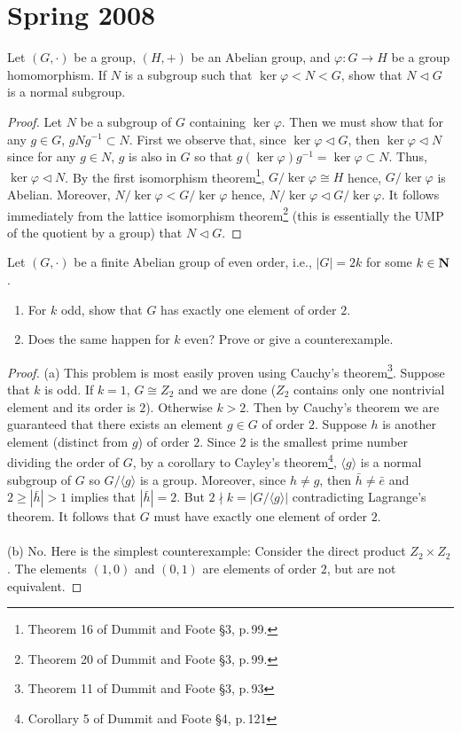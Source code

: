 \chapter{Spring 2008}
\begin{problem}
Let $(G,\cdot)$ be a group, $(H,+)$ be an Abelian group, and
$\varphi\colon G\to H$ be a group homomorphism. If $N$ is a subgroup such
that $\ker\varphi<N<G$, show that $N\lhd G$ is a normal subgroup.
\end{problem}
\begin{proof}
Let $N$ be a subgroup of $G$ containing $\ker\varphi$. Then we must show
that for any $g\in G$, $gNg^{-1}\subset N$. First we observe that, since
$\ker\varphi\lhd G$, then $\ker\varphi\lhd N$ since for any $g\in N$, $g$
is also in $G$ so that $g(\ker\varphi)g^{-1}=\ker\varphi\subset N$. Thus,
$\ker\varphi\lhd N$. By the first isomorphism theorem\footnote{Theorem 16
  of Dummit and Foote \S3, p.\,99.}, $G/\ker\varphi\cong H$ hence,
$G/\ker\varphi$ is Abelian. Moreover, $N/\ker\varphi<G/\ker\varphi$ hence,
$N/\ker\varphi\lhd G/\ker\varphi$. It follows immediately from the lattice
isomorphism theorem\footnote{Theorem 20 of Dummit and Foote \S3, p.\,99.} (this
is essentially the UMP of the quotient by a group) that $N\lhd G$.
\end{proof}
\begin{problem}
Let $(G,\cdot)$ be a finite Abelian group of even order, i.e., $|G|=2k$ for
some $k\in\mathbf{N}$.
\begin{enumerate}[noitemsep,label=(\alph*)]
\item For $k$ odd, show that $G$ has exactly one element of order $2$.
\item Does the same happen for $k$ even? Prove or give a counterexample.
\end{enumerate}
\end{problem}
\begin{proof}
(a) This problem is most easily proven using Cauchy's
theorem\footnote{Theorem 11 of Dummit and Foote \S3, p.\,93}. Suppose that
$k$ is odd. If $k=1$, $G\cong Z_2$ and we are done ($Z_2$ contains only one
nontrivial element and its order is $2$). Otherwise $k>2$. Then by Cauchy's
theorem we are guaranteed that there exists an element $g\in G$ of order
$2$. Suppose $h$ is another element (distinct from $g$) of order $2$. Since
$2$ is the smallest prime number dividing the order of $G$, by a corollary
to Cayley's theorem\footnote{Corollary 5 of Dummit and Foote \S4, p.\,121},
$\langle  g \rangle$ is a normal subgroup of $G$ so $G/\langle g \rangle$
is a group. Moreover, since $h\neq g$, then $\bar h\neq\bar e$ and
$2\geq|\bar h|>1$ implies that $|\bar h|=2$. But $2\nmid k=|G/\langle g
\rangle|$ contradicting Lagrange's theorem. It follows that $G$ must have
exactly one element of order $2$.
\\\\
(b) No. Here is the simplest counterexample: Consider the direct product
$Z_2\times Z_2$. The elements $(1,0)$ and $(0,1)$ are elements of order
$2$, but are not equivalent.
\end{proof}

